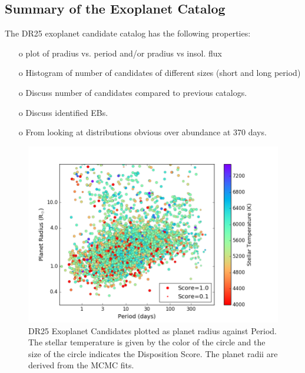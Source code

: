 \subsection{Summary of the Exoplanet Catalog}
The DR25 exoplanet candidate catalog has the following properties:
\begin{itemize}
    \item [o] plot of pradius vs. period and/or pradius vs insol. flux
    \item [o] Histogram of number of candidates of different sizes (short and long period)
    \item [o] Discuss number of candidates compared to previous catalogs.
    \item [o] Discuss identified EBs.
    \item [o] From looking at distributions obvious over abundance at 370 days.
\end{itemize}

\begin{figure}
    \centering
    \includegraphics[width=1.1\linewidth]{fig-CatalogRadiusPeriodScore.png}
    \caption{DR25 Exoplanet Candidates plotted as planet radius against Period. The stellar temperature is given by the color of the circle and the size of the circle indicates the Disposition Score. The planet radii are derived from the MCMC fits. }
    \label{f:catalogPlot}
\end{figure}

